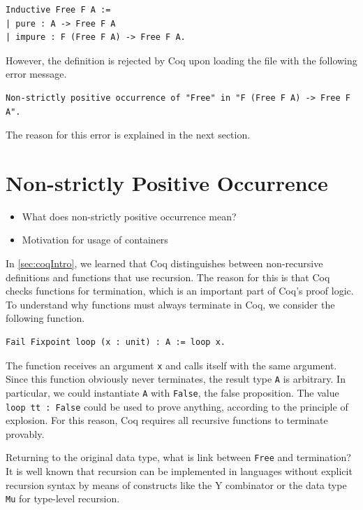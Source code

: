 \documentclass[a4paper, 11pt, fleqn, twoside]{scrreprt}
\begin{document}
\begin{verbatim}
Inductive Free F A :=
| pure : A -> Free F A
| impure : F (Free F A) -> Free F A.
\end{verbatim}

However, the definition is rejected by Coq upon loading the file with the 
following error message.

\begin{verbatim}
Non-strictly positive occurrence of "Free" in "F (Free F A) -> Free F A".
\end{verbatim}

The reason for this error is explained in the next section.

\section{Non-strictly Positive Occurrence}
\begin{itemize}
\item What does non-strictly positive occurrence mean?
\item Motivation for usage of containers
\end{itemize}

In \autoref{sec:coqIntro}, we learned that Coq distinguishes between 
non-recursive definitions and functions that use recursion. The reason for this 
is that Coq checks functions for termination, which is an important part of 
Coq's proof logic. To understand why functions must always terminate in Coq, we 
consider the following function.

\begin{verbatim}
Fail Fixpoint loop (x : unit) : A := loop x.
\end{verbatim}

The function receives an argument \texttt{x} and calls itself with the 
same argument. Since this function obviously never terminates, the result type 
\texttt{A} is arbitrary. In particular, we could instantiate 
\texttt{A} with \texttt{False}, the false proposition. The 
value \texttt{loop tt : False} could be used to prove anything,
according to the principle of explosion. For this reason, Coq requires all 
recursive functions to terminate provably.

Returning to the original data type, what is link between 
\texttt{Free} and termination? It is well known that recursion can be 
implemented in languages without explicit recursion syntax by means of 
constructs like the Y combinator or the data type \texttt{Mu} for 
type-level recursion.
\end{document}
